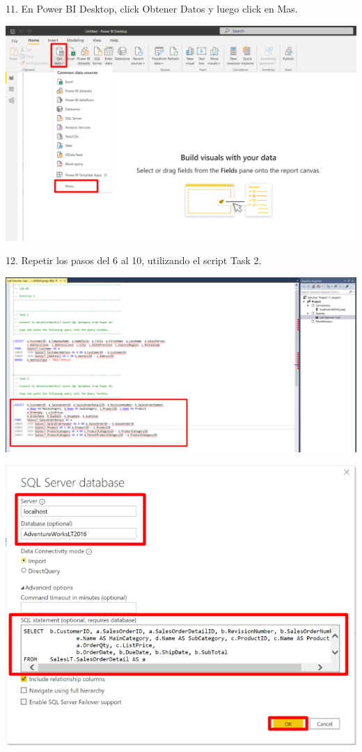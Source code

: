 \documentclass[12pt,letterpaper]{article}
\begin{document}
11. En Power BI Desktop, click Obtener Datos y luego click en Mas.
\begin{center}
    \includegraphics[width=15cm]{img/13.png}
    \vspace{2cm}  
\end{center}
12. Repetir los pasos del 6 al 10, utilizando el script Task 2.
\begin{center}
    \includegraphics[width=15cm]{img/14.png}  
\end{center}
\begin{center}
    \includegraphics[width=15cm]{img/15.png}  
\end{center}
\end{document}
